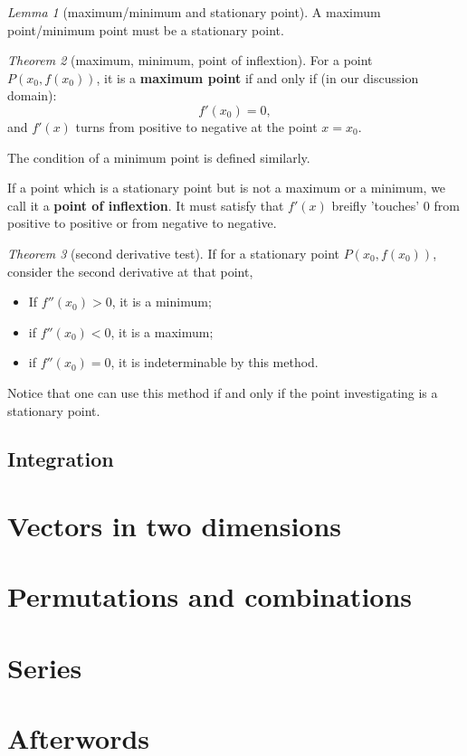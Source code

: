 \documentclass[8pt]{article}
\theoremstyle{remark}
\newtheorem{theorem}{Theorem}[section]
\newtheorem{lemma}[theorem]{Lemma}
\begin{document}
            \begin{lemma}[maximum/minimum and stationary point]
                A maximum point/minimum point must be a stationary point.
            \end{lemma}

            \begin{theorem}[maximum, minimum, point of inflextion]
                For a point $P(x_0, f(x_0))$, it is a \textbf{maximum point} if and only if (in our discussion domain):
                $$
                    f'(x_0) = 0,
                $$
                and $f'(x)$ turns from positive to negative at the point $x = x_0$.

                The condition of a minimum point is defined similarly.

                If a point which is a stationary point but is not a maximum or a minimum, we call it a \textbf{point of inflextion}. It must satisfy that $f'(x)$ breifly 'touches' $0$ from positive to positive or from negative to negative.
            \end{theorem}

            \begin{theorem}[second derivative test]
                If for a stationary point $P(x_0, f(x_0))$, consider the second derivative at that point,
                \begin{itemize}
                    \item If $f''(x_0) > 0$, it is a minimum;
                    \item if $f''(x_0) < 0$, it is a maximum;
                    \item if $f''(x_0) = 0$, it is indeterminable by this method.
                \end{itemize}
                
                Notice that one can use this method if and only if the point investigating is a stationary point. 
            \end{theorem}

        \subsection{Integration}

    \section{Vectors in two dimensions}

        

    \section{Permutations and combinations}

        

    \section{Series}

        

    \section*{Afterwords}

        
\end{document}
